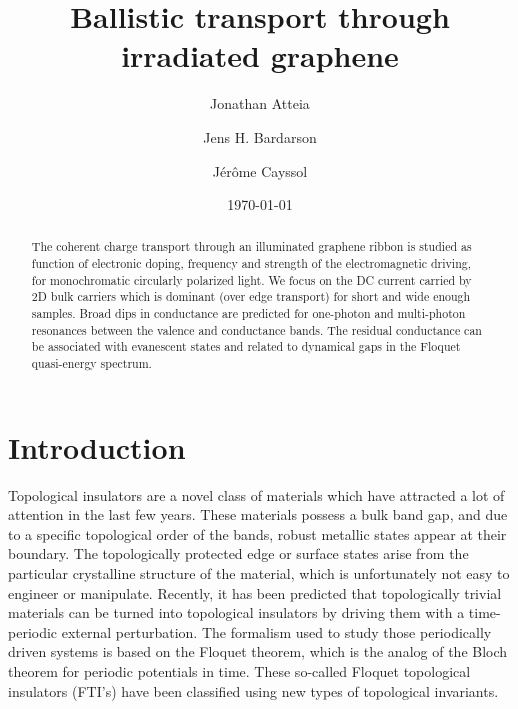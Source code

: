 \documentclass[aps,prb,showpacs,superscriptaddress,twocolumn,10pt,floatfix]{revtex4-1}
\begin{document}
\title{Ballistic transport through irradiated graphene}

\author{Jonathan Atteia}

\author{Jens H. Bardarson}


\author{J\'er\^ome Cayssol}


\date{\today}
\begin{abstract}
The coherent charge transport through an illuminated graphene ribbon is studied as function of electronic doping, frequency and strength of the electromagnetic driving, for monochromatic circularly polarized light. We focus on the DC current carried by 2D bulk carriers which is dominant (over edge transport) for short and wide enough samples. Broad dips in conductance are predicted for one-photon and multi-photon resonances between the valence and conductance bands. The residual conductance can be associated with evanescent states and related to dynamical gaps in the Floquet quasi-energy spectrum.     
\end{abstract}

\maketitle

\section{Introduction}

Topological insulators\cite{Hasan2010,Qi2011} are a novel class of materials which have attracted a lot of attention in the last few years. These materials possess a bulk band gap, and due to a specific topological order of the bands, robust metallic states appear at their boundary. The topologically protected edge or surface states arise from the particular crystalline structure of the material, which is unfortunately not easy to engineer or manipulate. Recently, it has been predicted that topologically trivial materials can be turned into topological insulators by driving them with a time-periodic external perturbation\cite{Oka2009,Inoue2010,Lindner2011,Kitagawa2010,Rudner2013}. The formalism used to study those periodically driven systems is based on the Floquet theorem\cite{Shirley1965,Sambe1973}, which is the analog of the Bloch theorem for periodic potentials in time. These so-called  Floquet topological insulators\cite{Lindner2011,Cayssol2013} (FTI's) have been classified using new types of topological invariants\cite{Kitagawa2010,Gomez2013,Rudner2013}. 
\end{document}
